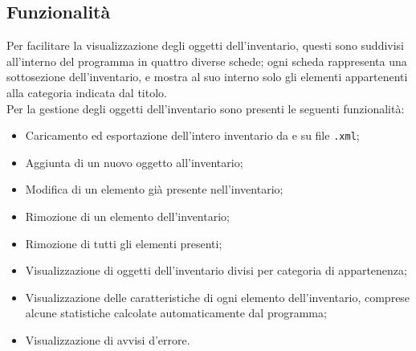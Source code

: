 \subsection{Funzionalità}
Per facilitare la visualizzazione degli oggetti dell'inventario, questi sono suddivisi all'interno del programma in quattro diverse schede; ogni scheda rappresenta una sottosezione dell'inventario, e mostra al suo interno solo gli elementi appartenenti alla categoria indicata dal titolo.\\
Per la gestione degli oggetti dell'inventario sono presenti le seguenti funzionalità:
\begin{itemize}
  \item Caricamento ed esportazione dell'intero inventario da e su file \texttt{.xml};
  \item Aggiunta di un nuovo oggetto all'inventario;
  \item Modifica di un elemento già presente nell'inventario;
  \item Rimozione di un elemento dell'inventario;
  \item Rimozione di tutti gli elementi presenti;
  \item Visualizzazione di oggetti dell'inventario divisi per categoria di appartenenza;
  \item Visualizzazione delle caratteristiche di ogni elemento dell'inventario, comprese alcune statistiche calcolate automaticamente dal programma;
  \item Visualizzazione di avvisi d'errore.
\end{itemize}
